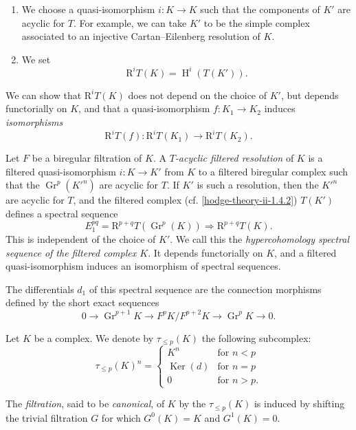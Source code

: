     
 \begin{enumerate}
      
 \item[(a)]
        We choose a quasi-isomorphism \(i\colon  K\to  K\) such that the components of \(K'\) are acyclic for \(T\).
        For example, we can take \(K'\) to be the simple complex associated to an injective Cartan–Eilenberg resolution of \(K\).
      

      
 \item[(b)]
        We set
        \[           \mathrm {R}^iT(K)           = \operatorname {H}^i(T(K')).         \]
      

    \end{enumerate}


    We can show that \(\mathrm {R}^iT(K)\) does not depend on the choice of \(K'\), but depends functorially on \(K\), and that a quasi-isomorphism \(f\colon  K_1\to  K_2\) induces \emph{isomorphisms}
    \[       \mathrm {R}^iT(f)\colon        \mathrm {R}^iT(K_1)       \to  \mathrm {R}^iT(K_2).     \]\label{hodge-theory-ii-1.4.5}\par{}Let \(F\) be a biregular filtration of \(K\).
    A \emph{\(T\)-acyclic filtered resolution} of \(K\) is a filtered quasi-isomorphism \(i\colon  K\to  K'\) from \(K\) to a filtered biregular complex such that the \(\operatorname {Gr}^p({K'}^n)\) are acyclic for \(T\).
    If \(K'\) is such a resolution, then the \({K'}^n\) are acyclic for \(T\), and the filtered complex (cf. \cref{hodge-theory-ii-1.4.2}) \(T(K')\) defines a spectral sequence
    \[       E_1^{pq}       = \mathrm {R}^{p+q}T(\operatorname {Gr}^p(K))       \Rightarrow  \mathrm {R}^{p+q}T(K).     \]
    This is independent of the choice of \(K'\).
    We call this the \emph{hypercohomology spectral sequence of the filtered complex \(K\)}.
    It depends functorially on \(K\), and a filtered quasi-isomorphism induces an isomorphism of spectral sequences.\par{}The differentials \(d_1\) of this spectral sequence are the connection morphisms defined by the short exact sequences
    \[       0       \to  \operatorname {Gr}^{p+1}K       \to  F^pK/F^{p+2}K       \to  \operatorname {Gr}^pK       \to  0.     \]\label{hodge-theory-ii-1.4.6}\par{}Let \(K\) be a complex.
    We denote by \(\tau _{\leqslant  p}(K)\) the following subcomplex:
    \[       \tau _{\leqslant  p}(K)^n       = \begin {cases}         K^n         &\text {for }n<p       \\\operatorname {Ker}(d)         &\text {for }n=p       \\0         &\text {for }n>p.       \end {cases}     \]\par{}The \emph{filtration}, said to be \emph{canonical}, of \(K\) by the \(\tau _{\leqslant  p}(K)\) is induced by shifting the trivial filtration \(G\) for which \(G^0(K)=K\) and \(G^1(K)=0\).

